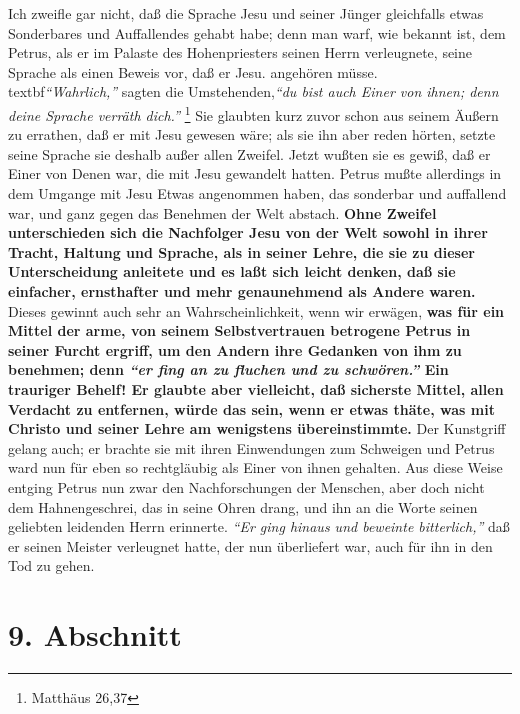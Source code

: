 Ich zweifle gar nicht, daß die Sprache Jesu
und seiner Jünger gleichfalls etwas
Sonderbares und Auffallendes gehabt habe; denn man warf, wie bekannt ist, dem
Petrus, als er im Palaste des Hohenpriesters
seinen Herrn verleugnete, seine
Sprache als einen Beweis vor, daß er Jesu. angehören müsse.
\\textbf{\textit{"`Wahrlich,"'} sagten
die Umstehenden,}\textit{"`du bist auch Einer von ihnen; denn deine Sprache
verräth
dich."'}
\footnote{Matthäus 26,37}
Sie glaubten kurz zuvor schon aus seinem Äußern
zu errathen, daß er mit Jesu gewesen wäre; als sie ihn aber reden hörten, setzte
seine Sprache sie deshalb außer allen Zweifel. Jetzt wußten sie es gewiß, daß er
Einer von Denen war, die mit Jesu gewandelt hatten. Petrus mußte allerdings in
dem Umgange mit Jesu Etwas angenommen haben, das sonderbar und auffallend war,
und ganz gegen das Benehmen der Welt abstach. \label{ref:10_08_sprache}
\textbf{Ohne Zweifel unterschieden sich
die  Nachfolger Jesu von der Welt sowohl in ihrer
Tracht, Haltung und Sprache,
als in seiner Lehre, die sie zu dieser Unterscheidung anleitete und es laßt sich
leicht denken, daß sie einfacher,
ernsthafter und mehr genaunehmend als Andere
waren.} Dieses gewinnt auch sehr an Wahrscheinlichkeit, wenn wir erwägen,
\textbf{was für
ein Mittel der arme, von seinem Selbstvertrauen betrogene Petrus in seiner
Furcht ergriff, um den Andern ihre Gedanken von ihm zu benehmen; denn
\textit{"`er fing
an zu fluchen und zu schwören."'} Ein trauriger Behelf! Er glaubte aber
vielleicht, daß sicherste Mittel, allen Verdacht zu entfernen, würde das sein,
wenn er etwas thäte, was mit Christo und seiner Lehre am wenigstens
übereinstimmte.} Der Kunstgriff gelang auch; er brachte sie mit ihren
Einwendungen zum Schweigen und Petrus ward nun für eben so
rechtgläubig als
Einer von ihnen gehalten. Aus diese Weise entging Petrus nun zwar den
Nachforschungen der Menschen, aber doch nicht dem Hahnengeschrei, das in seine
Ohren drang, und ihn an die Worte seinen geliebten leidenden Herrn erinnerte.
\textit{"`Er ging hinaus und beweinte bitterlich,"'} daß er seinen Meister
verleugnet
hatte, der nun überliefert war, auch für ihn in den Tod zu gehen.

\section{9. Abschnitt} \label{kap10_ab9}

